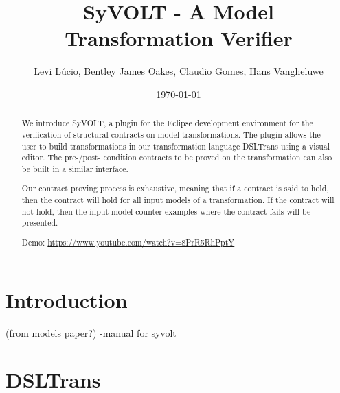 \documentclass[conference]{IEEEtran}
\begin{document}
\title{SyVOLT - A Model Transformation Verifier}
\author{Levi L\'{u}cio, Bentley James Oakes, Claudio Gomes, Hans Vangheluwe}

\author{
	}

\date{\today}


\maketitle




\begin{abstract}


We introduce SyVOLT, a plugin for the Eclipse development environment for the verification of structural contracts on model transformations. The plugin allows the user to build transformations in our transformation language DSLTrans using a visual editor. The pre-/post- condition contracts to be proved on the transformation can also be built in a similar interface.

Our contract proving process is exhaustive, meaning that if a contract is said to hold, then the contract will hold for all input models of a transformation. If the contract will not hold, then the input model counter-examples where the contract fails will be presented.

Demo: \url{https://www.youtube.com/watch?v=8PrR5RhPptY}



\end{abstract}


\section{Introduction}
\label{sec:intro}
%

(from models paper?)
-manual for syvolt

\section{DSLTrans}
\label{sec:DSLTrans}
%
\end{document}
